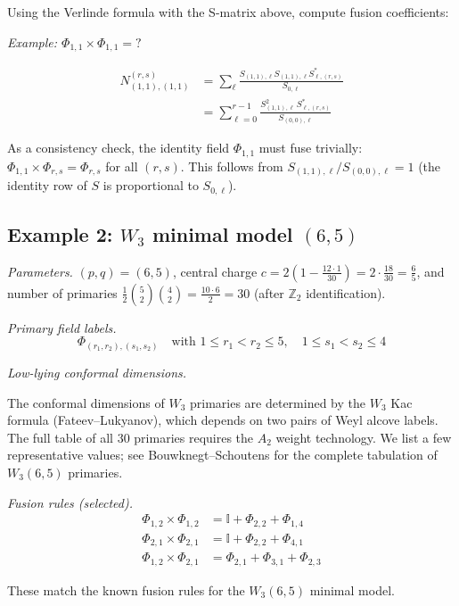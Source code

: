 \begin{computation}\label{comp:fusion-3-4}

Using the Verlinde formula with the S-matrix above, compute fusion coefficients:

\emph{Example: $\Phi_{1,1} \times \Phi_{1,1} = ?$}

\begin{align}
N_{(1,1),(1,1)}^{(r,s)} &= \sum_{\ell} \frac{S_{(1,1),\ell} S_{(1,1),\ell} S_{\ell,(r,s)}^*}
{S_{0,\ell}} \\
&= \sum_{\ell=0}^{r-1} \frac{S_{(1,1),\ell}^2\, S_{\ell,(r,s)}^*}{S_{(0,0),\ell}}
\end{align}

As a consistency check, the identity field $\Phi_{1,1}$ must fuse trivially: $\Phi_{1,1} \times \Phi_{r,s} = \Phi_{r,s}$ for all $(r,s)$. This follows from $S_{(1,1),\ell}/S_{(0,0),\ell} = 1$ (the identity row of $S$ is proportional to $S_{0,\ell}$).

\end{computation}

\subsection{\texorpdfstring{Example 2: $W_3$ minimal model $(6,5)$}{Example 2: W 3 minimal model (6,5)}}
\label{subsec:w3-example-6-5}

\begin{example}[\texorpdfstring{$W_3(6,5)$}{W_3(6,5)}]\label{ex:w3-6-5}

\emph{Parameters.}
$(p,q) = (6,5)$, central charge $c = 2(1 - \frac{12 \cdot 1}{30}) = 2 \cdot \frac{18}{30}
= \frac{6}{5}$, and number of primaries $\frac{1}{2}\binom{5}{2}\binom{4}{2} = \frac{10 \cdot 6}{2} = 30$ (after $\mathbb{Z}_2$ identification).

\emph{Primary field labels.}
\[\Phi_{(r_1,r_2),(s_1,s_2)} \quad \text{with } 1 \leq r_1 < r_2 \leq 5, \quad 1 \leq s_1 < s_2 \leq 4\]

\emph{Low-lying conformal dimensions.}

The conformal dimensions of $W_3$ primaries are determined by the $W_3$ Kac formula (Fateev--Lukyanov), which depends on two pairs of Weyl alcove labels. The full table of all 30 primaries requires the $A_2$ weight technology. We list a few representative values; see Bouwknegt--Schoutens for the complete tabulation of $W_3(6,5)$ primaries.

\emph{Fusion rules (selected).}
\begin{align}
\Phi_{1,2} \times \Phi_{1,2} &= \mathbb{I} + \Phi_{2,2} + \Phi_{1,4} \\
\Phi_{2,1} \times \Phi_{2,1} &= \mathbb{I} + \Phi_{2,2} + \Phi_{4,1} \\
\Phi_{1,2} \times \Phi_{2,1} &= \Phi_{2,1} + \Phi_{3,1} + \Phi_{2,3}
\end{align}

These match the known fusion rules for the $W_3(6,5)$ minimal model.
\end{example}

